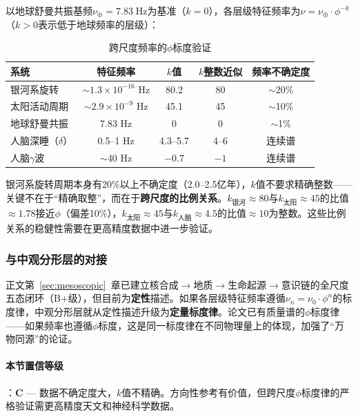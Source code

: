 以地球舒曼共振基频$\nu_{\oplus} = 7.83\;\text{Hz}$为基准（$k=0$），各层级特征频率为$\nu = \nu_{\oplus} \cdot \phi^{-k}$（$k>0$表示低于地球频率的层级）：

\begin{table}[htbp]
\centering
\caption{跨尺度频率的$\phi$标度验证}
\label{tab:cross_scale}
\begin{tabular}{lcccc}
\hline
系统 & 特征频率 & $k$值 & $k$整数近似 & 频率不确定度 \\
\hline
银河系旋转 & $\sim 1.3\times10^{-16}$ Hz & 80.2 & 80 & $\sim$20\% \\
太阳活动周期 & $\sim 2.9\times10^{-9}$ Hz & 45.1 & 45 & $\sim$10\% \\
地球舒曼共振 & 7.83 Hz & 0 & 0 & $\sim$1\% \\
人脑深睡（$\delta$） & 0.5--1 Hz & 4.3--5.7 & 4--6 & 连续谱 \\
人脑$\gamma$波 & $\sim$40 Hz & $-0.7$ & $-1$ & 连续谱 \\
\hline
\end{tabular}
\end{table}

\begin{remark}[数据不确定度的诚实标注]
\label{rmk:cross_scale_caveat}
银河系旋转周期本身有20\%以上不确定度（2.0--2.5亿年），$k$值不要求精确整数——关键不在于``精确取整''，而在于\textbf{跨尺度的比例关系}。$k_{\text{银河}}\approx 80$与$k_{\text{太阳}}\approx 45$的比值$\approx 1.78$接近$\phi$（偏差10\%），$k_{\text{太阳}}\approx 45$与$k_{\text{人脑}}\approx 4.5$的比值$\approx 10$为整数。这些比例关系的稳健性需要在更高精度数据中进一步验证。
\end{remark}

\subsubsection{与中观分形层的对接}

正文第~\ref{sec:mesoscopic}~章已建立核合成$\to$地质$\to$生命起源$\to$意识链的全尺度五态闭环（B+级），但目前为\textbf{定性}描述。如果各层级特征频率遵循$\nu_n = \nu_0 \cdot \phi^n$的标度律，中观分形层就从定性描述升级为\textbf{定量标度律}。论文已有质量谱的$\phi$标度律——如果频率也遵循$\phi$标度，这是同一标度律在不同物理量上的体现，加强了``万物同源''的论证。

\paragraph{本节置信等级}：\textbf{C} --- 数据不确定度大，$k$值不精确。方向性参考有价值，但跨尺度$\phi$标度律的严格验证需更高精度天文和神经科学数据。

